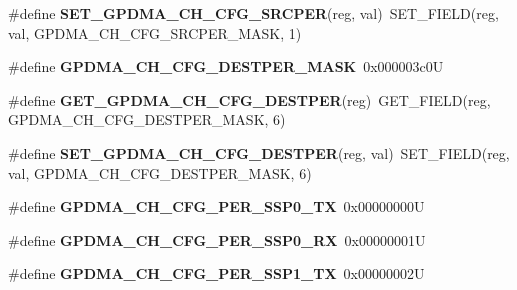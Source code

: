 \begin{DoxyCompactItemize}
\item 
\mbox{\label{group__lpc24xx__regs_ga9e3e09499193f2b695741f0977816e34}} 
\#define {\bfseries S\+E\+T\+\_\+\+G\+P\+D\+M\+A\+\_\+\+C\+H\+\_\+\+C\+F\+G\+\_\+\+S\+R\+C\+P\+ER}(reg,  val)~S\+E\+T\+\_\+\+F\+I\+E\+LD(reg, val, G\+P\+D\+M\+A\+\_\+\+C\+H\+\_\+\+C\+F\+G\+\_\+\+S\+R\+C\+P\+E\+R\+\_\+\+M\+A\+SK, 1)
\item 
\mbox{\label{group__lpc24xx__regs_gab0e9119ff622f0842e624d199b426d33}} 
\#define {\bfseries G\+P\+D\+M\+A\+\_\+\+C\+H\+\_\+\+C\+F\+G\+\_\+\+D\+E\+S\+T\+P\+E\+R\+\_\+\+M\+A\+SK}~0x000003c0U
\item 
\mbox{\label{group__lpc24xx__regs_ga938afd68c9675b14ae2fe73a54d6cc70}} 
\#define {\bfseries G\+E\+T\+\_\+\+G\+P\+D\+M\+A\+\_\+\+C\+H\+\_\+\+C\+F\+G\+\_\+\+D\+E\+S\+T\+P\+ER}(reg)~G\+E\+T\+\_\+\+F\+I\+E\+LD(reg, G\+P\+D\+M\+A\+\_\+\+C\+H\+\_\+\+C\+F\+G\+\_\+\+D\+E\+S\+T\+P\+E\+R\+\_\+\+M\+A\+SK, 6)
\item 
\mbox{\label{group__lpc24xx__regs_gaee536e12c5fec0f889de6d84b85ef8d1}} 
\#define {\bfseries S\+E\+T\+\_\+\+G\+P\+D\+M\+A\+\_\+\+C\+H\+\_\+\+C\+F\+G\+\_\+\+D\+E\+S\+T\+P\+ER}(reg,  val)~S\+E\+T\+\_\+\+F\+I\+E\+LD(reg, val, G\+P\+D\+M\+A\+\_\+\+C\+H\+\_\+\+C\+F\+G\+\_\+\+D\+E\+S\+T\+P\+E\+R\+\_\+\+M\+A\+SK, 6)
\item 
\mbox{\label{group__lpc24xx__regs_gaa38c7048db5ff10932d0d4e50c7df175}} 
\#define {\bfseries G\+P\+D\+M\+A\+\_\+\+C\+H\+\_\+\+C\+F\+G\+\_\+\+P\+E\+R\+\_\+\+S\+S\+P0\+\_\+\+TX}~0x00000000U
\item 
\mbox{\label{group__lpc24xx__regs_gadab69b2bda64964bd004a8fc4573f948}} 
\#define {\bfseries G\+P\+D\+M\+A\+\_\+\+C\+H\+\_\+\+C\+F\+G\+\_\+\+P\+E\+R\+\_\+\+S\+S\+P0\+\_\+\+RX}~0x00000001U
\item 
\mbox{\label{group__lpc24xx__regs_gad3c9868f33451da0eefa2113849aa586}} 
\#define {\bfseries G\+P\+D\+M\+A\+\_\+\+C\+H\+\_\+\+C\+F\+G\+\_\+\+P\+E\+R\+\_\+\+S\+S\+P1\+\_\+\+TX}~0x00000002U
\item 
\mbox{\label{group__lpc24xx__regs_gac7fcb12db13ddc1a77d20dcd25b523de}} 

\end{DoxyCompactItemize}
